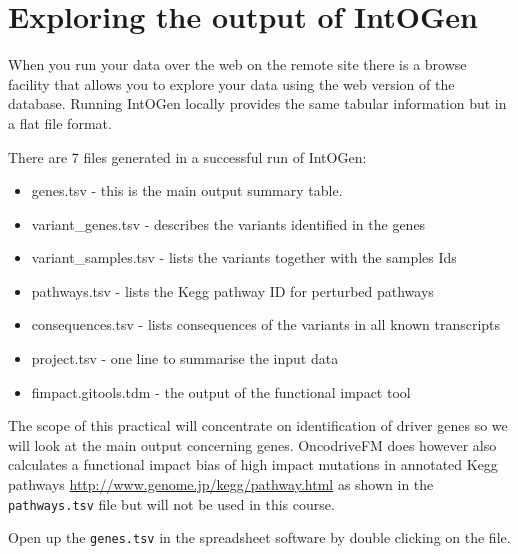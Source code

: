 \section{Exploring the output of IntOGen}

\begin{information}
When you run your data over the web on the remote site there is a browse facility that
allows you to explore your data using the web version of the database. Running IntOGen locally
provides the same tabular information but in a flat file format.
\end{information}

\begin{information}
There are 7 files generated in a successful run of IntOGen:
\begin{itemize}
 \item genes.tsv - this is the main output summary table.
 \item variant\_genes.tsv - describes the variants identified in the genes
 \item variant\_samples.tsv - lists the variants together with the samples Ids
 \item pathways.tsv - lists the Kegg pathway ID for perturbed pathways
 \item consequences.tsv - lists consequences of the variants in all known transcripts
 \item project.tsv - one line to summarise the input data
 \item fimpact.gitools.tdm - the output of the functional impact tool
\end{itemize}
\end{information}

The scope of this practical will concentrate on identification of driver genes so we
will look at the main output concerning genes. OncodriveFM does however also
calculates a functional impact bias of high impact mutations in annotated Kegg
pathways \url{http://www.genome.jp/kegg/pathway.html} as shown in the
\texttt{pathways.tsv} file but will not be used in this course.

\begin{steps}
Open up the \texttt{genes.tsv} in the spreadsheet software by double clicking on the file.
\end{steps}

